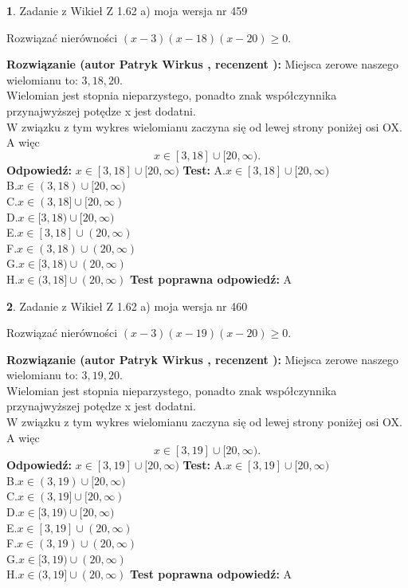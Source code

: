 \documentclass[12pt, a4paper]{article}
\theoremstyle{definition} %
\newtheorem{zad}{}
\newcommand{\zadStart}[1]{\begin{zad}#1\newline}
\newcommand{\zadStop}{\end{zad}}
\newcommand{\rozwStart}[2]{\noindent \textbf{Rozwiązanie (autor #1 , recenzent #2): }\newline}
\newcommand{\rozwStop}{\newline}
\newcommand{\odpStart}{\noindent \textbf{Odpowiedź:}\newline}
\newcommand{\odpStop}{\newline}
\newcommand{\testStart}{\noindent \textbf{Test:}\newline}
\newcommand{\testStop}{\newline}
\newcommand{\kluczStart}{\noindent \textbf{Test poprawna odpowiedź:}\newline}
\newcommand{\kluczStop}{\newline}
\begin{document}
\zadStart{Zadanie z Wikieł Z 1.62 a) moja wersja nr 459}

Rozwiązać nierówności $(x-3)(x-18)(x-20)\ge0$.
\zadStop
\rozwStart{Patryk Wirkus}{}
Miejsca zerowe naszego wielomianu to: $3, 18, 20$.\\
Wielomian jest stopnia nieparzystego, ponadto znak współczynnika przy\linebreak najwyższej potędze x jest dodatni.\\ W związku z tym wykres wielomianu zaczyna się od lewej strony poniżej osi OX. A więc $$x \in [3,18] \cup [20,\infty).$$
\rozwStop
\odpStart
$x \in [3,18] \cup [20,\infty)$
\odpStop
\testStart
A.$x \in [3,18] \cup [20,\infty)$\\
B.$x \in (3,18) \cup [20,\infty)$\\
C.$x \in (3,18] \cup [20,\infty)$\\
D.$x \in [3,18) \cup [20,\infty)$\\
E.$x \in [3,18] \cup (20,\infty)$\\
F.$x \in (3,18) \cup (20,\infty)$\\
G.$x \in [3,18) \cup (20,\infty)$\\
H.$x \in (3,18] \cup (20,\infty)$
\testStop
\kluczStart
A
\kluczStop



\zadStart{Zadanie z Wikieł Z 1.62 a) moja wersja nr 460}

Rozwiązać nierówności $(x-3)(x-19)(x-20)\ge0$.
\zadStop
\rozwStart{Patryk Wirkus}{}
Miejsca zerowe naszego wielomianu to: $3, 19, 20$.\\
Wielomian jest stopnia nieparzystego, ponadto znak współczynnika przy\linebreak najwyższej potędze x jest dodatni.\\ W związku z tym wykres wielomianu zaczyna się od lewej strony poniżej osi OX. A więc $$x \in [3,19] \cup [20,\infty).$$
\rozwStop
\odpStart
$x \in [3,19] \cup [20,\infty)$
\odpStop
\testStart
A.$x \in [3,19] \cup [20,\infty)$\\
B.$x \in (3,19) \cup [20,\infty)$\\
C.$x \in (3,19] \cup [20,\infty)$\\
D.$x \in [3,19) \cup [20,\infty)$\\
E.$x \in [3,19] \cup (20,\infty)$\\
F.$x \in (3,19) \cup (20,\infty)$\\
G.$x \in [3,19) \cup (20,\infty)$\\
H.$x \in (3,19] \cup (20,\infty)$
\testStop
\kluczStart
A
\kluczStop
\end{document}
